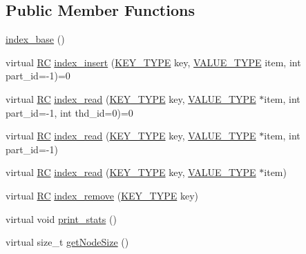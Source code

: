 \subsection*{Public Member Functions}
\begin{DoxyCompactItemize}
\item 
\hyperlink{classindex__base_a080b89f830ec83536c2a28103ebd5b28}{index\+\_\+base} ()
\item 
virtual \hyperlink{global_8h_a78c49a674c810fdd03d20432f7be864a}{RC} \hyperlink{classindex__base_a819b2cb7cbc7c740381e64d4c9023745}{index\+\_\+insert} (\hyperlink{index__base_8h_ae35c40bc2f912c11f0e36ac66cba4489}{K\+E\+Y\+\_\+\+T\+Y\+PE} key, \hyperlink{microbench_2main_8cpp_ae17cb099b4c9aee7835032339b5a9e0d}{V\+A\+L\+U\+E\+\_\+\+T\+Y\+PE} item, int part\+\_\+id=-\/1)=0
\item 
virtual \hyperlink{global_8h_a78c49a674c810fdd03d20432f7be864a}{RC} \hyperlink{classindex__base_ae63072105f55821091506f1a6557dd1c}{index\+\_\+read} (\hyperlink{index__base_8h_ae35c40bc2f912c11f0e36ac66cba4489}{K\+E\+Y\+\_\+\+T\+Y\+PE} key, \hyperlink{microbench_2main_8cpp_ae17cb099b4c9aee7835032339b5a9e0d}{V\+A\+L\+U\+E\+\_\+\+T\+Y\+PE} $\ast$item, int part\+\_\+id=-\/1, int thd\+\_\+id=0)=0
\item 
virtual \hyperlink{global_8h_a78c49a674c810fdd03d20432f7be864a}{RC} \hyperlink{classindex__base_a044a748df8945a60af8ab815b555960a}{index\+\_\+read} (\hyperlink{index__base_8h_ae35c40bc2f912c11f0e36ac66cba4489}{K\+E\+Y\+\_\+\+T\+Y\+PE} key, \hyperlink{microbench_2main_8cpp_ae17cb099b4c9aee7835032339b5a9e0d}{V\+A\+L\+U\+E\+\_\+\+T\+Y\+PE} $\ast$item, int part\+\_\+id=-\/1)
\item 
virtual \hyperlink{global_8h_a78c49a674c810fdd03d20432f7be864a}{RC} \hyperlink{classindex__base_aa51e3945ff304a47364499c3e716a87f}{index\+\_\+read} (\hyperlink{index__base_8h_ae35c40bc2f912c11f0e36ac66cba4489}{K\+E\+Y\+\_\+\+T\+Y\+PE} key, \hyperlink{microbench_2main_8cpp_ae17cb099b4c9aee7835032339b5a9e0d}{V\+A\+L\+U\+E\+\_\+\+T\+Y\+PE} $\ast$item)
\item 
virtual \hyperlink{global_8h_a78c49a674c810fdd03d20432f7be864a}{RC} \hyperlink{classindex__base_a9af0a86bbc85f29fa12d1394317b6fbd}{index\+\_\+remove} (\hyperlink{index__base_8h_ae35c40bc2f912c11f0e36ac66cba4489}{K\+E\+Y\+\_\+\+T\+Y\+PE} key)
\item 
virtual void \hyperlink{classindex__base_a2515fc45e7ca43a9914c0410a9b663c8}{print\+\_\+stats} ()
\item 
virtual size\+\_\+t \hyperlink{classindex__base_ab8bfe46c64ea1ab3c596c46f0b76064e}{get\+Node\+Size} ()

\end{DoxyCompactItemize}
